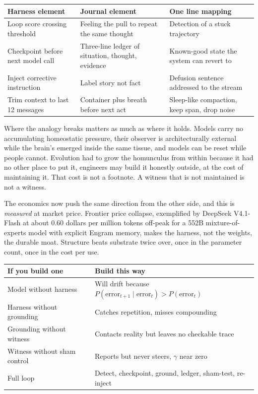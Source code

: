 \begin{center}
\small
\begin{tabular}{p{2.8cm}p{4.2cm}p{5.6cm}}
\toprule
Harness element & Journal element & One line mapping \\
\midrule
Loop score crossing threshold & Feeling the pull to repeat the same thought & Detection of a stuck trajectory \\
Checkpoint before next model call & Three-line ledger of situation, thought, evidence & Known-good state the system can revert to \\
Inject corrective instruction & Label story not fact & Defusion sentence addressed to the stream \\
Trim context to last 12 messages & Container plus breath before next act & Sleep-like compaction, keep span, drop noise \\
\bottomrule
\end{tabular}
\end{center}

Where the analogy breaks matters as much as where it holds. Models carry no accumulating homeostatic pressure, their observer is architecturally external while the brain's emerged inside the same tissue, and models can be reset while people cannot. Evolution had to grow the homunculus from within because it had no other place to put it, engineers may build it honestly outside, at the cost of maintaining it. That cost is not a footnote. A witness that is not maintained is not a witness.

The economics now push the same direction from the other side, and this is \textit{measured} at market price. Frontier price collapse, exemplified by DeepSeek V4.1-Flash at about 0.60 dollars per million tokens off-peak for a 552B mixture-of-experts model with explicit Engram memory, makes the harness, not the weights, the durable moat. Structure beats substrate twice over, once in the parameter count, once in the cost per use.

\begin{center}
\small
\begin{tabular}{p{5.0cm}p{7.8cm}}
\toprule
If you build one & Build this way \\
\midrule
Model without harness & Will drift because $P(\text{error}_{t+1} \mid \text{error}_t) > P(\text{error}_t)$ \\
Harness without grounding & Catches repetition, misses compounding \\
Grounding without witness & Contacts reality but leaves no checkable trace \\
Witness without sham control & Reports but never steers, $\gamma$ near zero \\
Full loop & Detect, checkpoint, ground, ledger, sham-test, re-inject \\
\bottomrule
\end{tabular}
\end{center}

